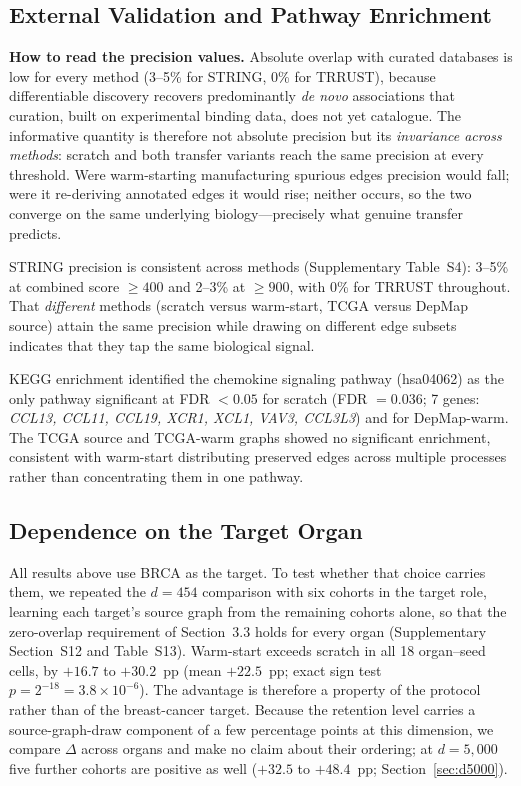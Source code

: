 \documentclass{ws-jbcb}
\begin{document}
\subsection{External Validation and Pathway Enrichment}

\noindent\textbf{How to read the precision values.} Absolute overlap with curated databases is low for every method (3--5\% for STRING, 0\% for TRRUST), because differentiable discovery recovers predominantly \textit{de novo} associations that curation, built on experimental binding data, does not yet catalogue. The informative quantity is therefore not absolute precision but its \textit{invariance across methods}: scratch and both transfer variants reach the same precision at every threshold. Were warm-starting manufacturing spurious edges precision would fall; were it re-deriving annotated edges it would rise; neither occurs, so the two converge on the same underlying biology---precisely what genuine transfer predicts.

STRING precision is consistent across methods (Supplementary Table~S4): 3--5\% at combined score $\geq 400$ and 2--3\% at $\geq 900$, with 0\% for TRRUST throughout. That \textit{different} methods (scratch versus warm-start, TCGA versus DepMap source) attain the same precision while drawing on different edge subsets indicates that they tap the same biological signal.

KEGG enrichment identified the chemokine signaling pathway (hsa04062) as the only pathway significant at FDR $<0.05$ for scratch (FDR $=0.036$; 7 genes: \textit{CCL13, CCL11, CCL19, XCR1, XCL1, VAV3, CCL3L3})\cite{benjamini1995controlling,subramanian2005gene} and for DepMap-warm. The TCGA source and TCGA-warm graphs showed no significant enrichment, consistent with warm-start distributing preserved edges across multiple processes rather than concentrating them in one pathway.

\subsection{Dependence on the Target Organ}

All results above use BRCA as the target. To test whether that choice carries them, we repeated the $d=454$ comparison with six cohorts in the target role, learning each target's source graph from the remaining cohorts alone, so that the zero-overlap requirement of Section~3.3 holds for every organ (Supplementary Section~S12 and Table~S13). Warm-start exceeds scratch in all 18 organ--seed cells, by $+16.7$ to $+30.2$~pp (mean $+22.5$~pp; exact sign test $p=2^{-18}=3.8\times10^{-6}$). The advantage is therefore a property of the protocol rather than of the breast-cancer target. Because the retention level carries a source-graph-draw component of a few percentage points at this dimension, we compare $\Delta$ across organs and make no claim about their ordering; at $d=5{,}000$ five further cohorts are positive as well ($+32.5$ to $+48.4$~pp; Section~\ref{sec:d5000}).
\end{document}

